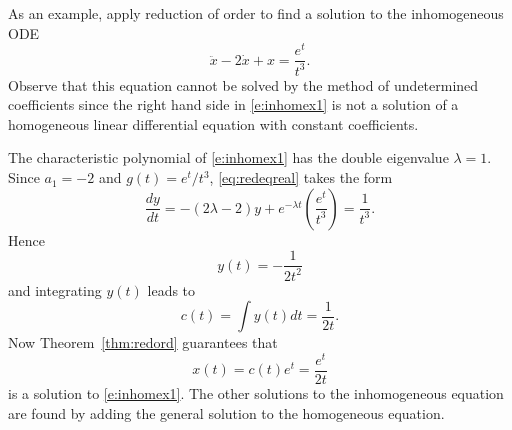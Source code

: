 \documentclass{ximera}
\begin{document}
As an example, apply reduction of order to find a solution to the inhomogeneous
ODE
\begin{equation}  \label{e:inhomex1}
\ddot{x} - 2\dot{x} + x = \frac{e^t}{t^3}.
\end{equation}
Observe that this equation cannot be solved by the method of undetermined
coefficients since the right hand 
side in \eqref{e:inhomex1} is not a
solution of a homogeneous linear differential equation with constant 
coefficients.

The characteristic polynomial of \eqref{e:inhomex1} has the double eigenvalue 
$\lambda = 1$.  Since $a_1=-2$ and $g(t) = e^t/t^3$, \eqref{eq:redeqreal} takes 
the form
\[
\frac{dy}{dt} = -(2\lambda -2) y + e^{-\lambda t}\left( \frac{e^t}{t^3}\right)
= \frac{1}{t^3}.
\]
Hence 
\[
y(t) = -\frac{1}{2t^2}
\]
and integrating $y(t)$ leads to
\[
c(t) = \int y(t) dt = \frac{1}{2t}.
\]
Now Theorem~\ref{thm:redord} guarantees that
\[
x(t) = c(t)e^t = \frac{e^t}{2t}
\]
is a solution to \eqref{e:inhomex1}.  The other solutions to the inhomogeneous
equation are found by adding the general solution 
to the homogeneous equation.





\end{document}
